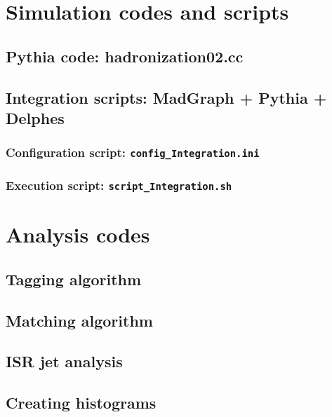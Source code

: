 \documentclass[12pt, oneside]{book}              %
\begin{document}
\begin{appendices}

\chapter[Simulation codes]{Simulation codes and scripts}\label{App:Simulation_codes}
\section[Pythia code]{Pythia code: hadronization02.cc}\label{App:hadronization02.cc}

\newpage
\section[Integration scripts]{Integration scripts: MadGraph + Pythia + Delphes}\label{App:scripts}
\subsection{Configuration script: \texttt{config\_Integration.ini}}\label{sub:Configuration_script}

\subsection{Execution script: \texttt{script\_Integration.sh}}\label{sub:Execution_script}


\chapter[Analysis codes]{Analysis codes}\label{App:Analysis_codes}
\section[Tagging algorithm]{Tagging algorithm}\label{App:Tagging_code}

\section[Matching algorithm]{Matching algorithm}\label{App:Matching_code}

\section[ISR jet analysis]{ISR jet analysis}\label{App:ISR_analysis}

\section[Creating histograms]{Creating histograms}\label{App:Creating_histos_code}



\end{appendices}




	
\end{document}
